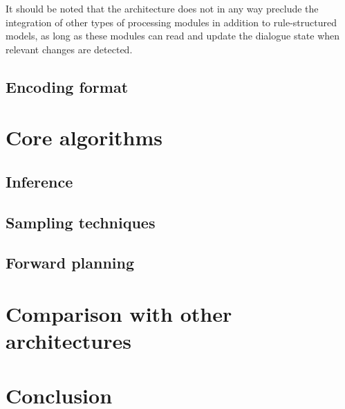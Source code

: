 It should be noted that the architecture does not in any way preclude the integration of other types of processing modules in addition to rule-structured models, as long as these modules can read and update the dialogue state when relevant changes are detected. 


\subsection{Encoding format}




\section{Core algorithms}

\subsection{Inference}


\subsection{Sampling techniques}

\subsection{Forward planning}




\section{Comparison with other architectures}


\section{Conclusion}
